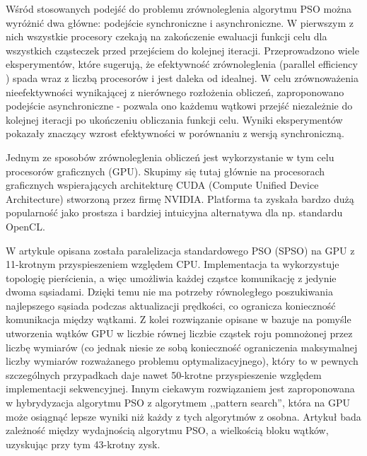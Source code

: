 \documentclass[12pt, twoside, openany, abstract=on]{report}
\theoremstyle{definition}
\begin{document}
Wśród stosowanych podejść do problemu zrównoleglenia algorytmu PSO można wyróżnić dwa główne: podejście synchroniczne i asynchroniczne. W pierwszym z nich wszystkie procesory czekają na zakończenie ewaluacji funkcji celu dla wszystkich cząsteczek przed przejściem do kolejnej iteracji. Przeprowadzono wiele eksperymentów, które sugerują, że efektywność zrównoleglenia (parallel efficiency%
) spada wraz z liczbą procesorów i jest daleka od idealnej.
W celu zrównoważenia nieefektywności wynikającej z nierównego rozłożenia obliczeń, zaproponowano podejście asynchroniczne - pozwala ono każdemu wątkowi przejść niezależnie do kolejnej iteracji po ukończeniu obliczania funkcji celu. Wyniki eksperymentów pokazały znaczący wzrost efektywności w porównaniu z wersją synchroniczną. 

Jednym ze sposobów zrównoleglenia obliczeń jest wykorzystanie w tym celu procesorów graficznych (GPU). Skupimy się tutaj głównie na procesorach graficznych wspierających architekturę CUDA (Compute Unified Device Architecture) \cite{CudaProgGuide} stworzoną przez firmę NVIDIA. Platforma ta zyskała bardzo dużą popularność jako prostsza i bardziej intuicyjna alternatywa dla np. standardu OpenCL.


W artykule \cite{GpuBasedPso} opisana została paralelizacja 
 standardowego PSO (SPSO) na GPU z 11-krotnym przyspieszeniem względem CPU. Implementacja ta wykorzystuje topologię pierścienia, a więc umożliwia każdej cząstce komunikację z jedynie dwoma sąsiadami. Dzięki temu nie ma potrzeby równoległego poszukiwania najlepszego sąsiada podczas aktualizacji prędkości, co ogranicza konieczność komunikacja między wątkami. Z kolei rozwiązanie opisane w \cite{PsoCuda} bazuje na pomyśle utworzenia wątków GPU w liczbie równej liczbie cząstek roju pomnożonej przez liczbę wymiarów (co jednak niesie ze sobą konieczność ograniczenia maksymalnej liczby wymiarów rozważanego problemu optymalizacyjnego), który to w pewnych szczególnych przypadkach daje nawet 50-krotne przyspieszenie względem implementacji sekwencyjnej. Innym ciekawym rozwiązaniem jest zaproponowana w \cite{PsoGraphHardLocPat} hybrydyzacja algorytmu PSO z algorytmem ,,pattern search'', która na GPU może osiągnąć lepsze wyniki niż każdy z tych algorytmów z osobna. 
Artykuł \cite{BlockOccupancyGpu} bada zależność między wydajnością algorytmu PSO, a wielkością bloku wątków, uzyskując przy tym 43-krotny zysk.
\end{document}
